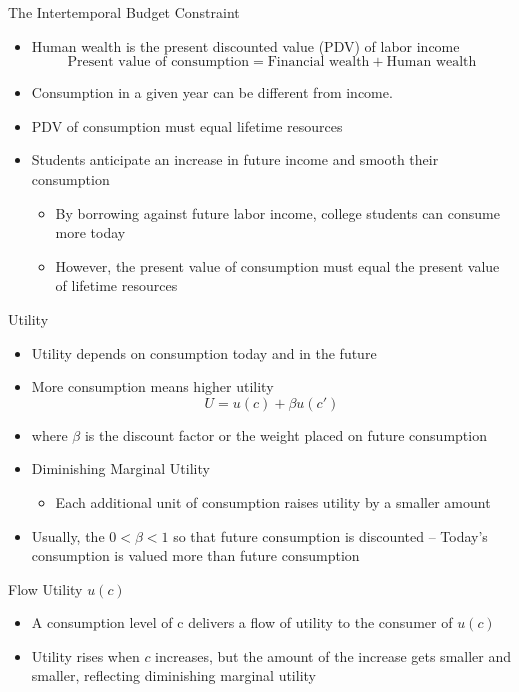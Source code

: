 \documentclass[aspectratio=1610]{beamer}
\begin{document}
\begin{frame}[wide]{The Intertemporal Budget Constraint}
	\begin{itemize}
		\item Human wealth is the present discounted value (PDV) of labor income
		\[\text{Present value of consumption} = \text{Financial wealth} + \text{Human wealth}\]
		\item Consumption in a given year can be different from income.
		\item PDV of consumption must equal lifetime resources
		\item Students anticipate an increase in future income and smooth their consumption
		\vspace{1mm}
		\begin{itemize}
			\item By borrowing against future labor income, college students can consume more today
			\item However, the present value of consumption must equal the present value of lifetime resources
		\end{itemize}
	\end{itemize}
\end{frame}

\begin{frame}[wide]{Utility}
	\begin{itemize}
		\item Utility depends on consumption today and in the future
		\item More consumption means higher utility 
		\[U = u(c) + \beta u(c')\]
		\item[] where $\beta$ is the discount factor or the weight placed on future consumption
		\item Diminishing Marginal Utility
		\begin{itemize}
			\item Each additional unit of consumption raises utility by a smaller amount
		\end{itemize}
		\item Usually, the $0<\beta<1$ so that future consumption is discounted -- Today’s consumption is valued more than future consumption
		
	\end{itemize}
\end{frame}

\begin{frame}[wide]{Flow Utility $u(c)$}
	\begin{itemize}
		\item A consumption level of c delivers a flow of utility to the consumer of $u(c)$
		\item Utility rises when $c$ increases, but the amount of the increase gets smaller and smaller, reflecting diminishing marginal utility
	\end{itemize}
	\begin{figure}
		\centering
	\end{figure}
	
\end{frame}
\end{document}
